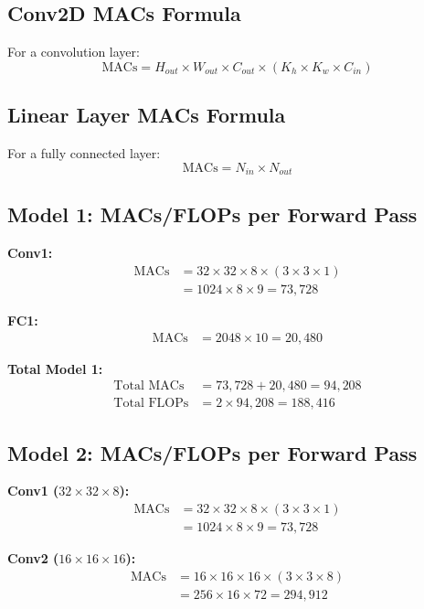 \documentclass[11pt,a4paper]{article}
\begin{document}
\subsection{Conv2D MACs Formula}
For a convolution layer:
\begin{equation}
\text{MACs} = H_{out} \times W_{out} \times C_{out} \times (K_h \times K_w \times C_{in})
\end{equation}

\subsection{Linear Layer MACs Formula}
For a fully connected layer:
\begin{equation}
\text{MACs} = N_{in} \times N_{out}
\end{equation}

\subsection{Model 1: MACs/FLOPs per Forward Pass}

\textbf{Conv1:}
\begin{align*}
\text{MACs} &= 32 \times 32 \times 8 \times (3 \times 3 \times 1) \\
&= 1024 \times 8 \times 9 = 73,728
\end{align*}

\textbf{FC1:}
\begin{align*}
\text{MACs} &= 2048 \times 10 = 20,480
\end{align*}

\textbf{Total Model 1:}
\begin{align*}
\text{Total MACs} &= 73,728 + 20,480 = \boxed{94,208} \\
\text{Total FLOPs} &= 2 \times 94,208 = \boxed{188,416}
\end{align*}

\subsection{Model 2: MACs/FLOPs per Forward Pass}

\textbf{Conv1 ($32 \times 32 \times 8$):}
\begin{align*}
\text{MACs} &= 32 \times 32 \times 8 \times (3 \times 3 \times 1) \\
&= 1024 \times 8 \times 9 = 73,728
\end{align*}

\textbf{Conv2 ($16 \times 16 \times 16$):}
\begin{align*}
\text{MACs} &= 16 \times 16 \times 16 \times (3 \times 3 \times 8) \\
&= 256 \times 16 \times 72 = 294,912
\end{align*}
\end{document}
